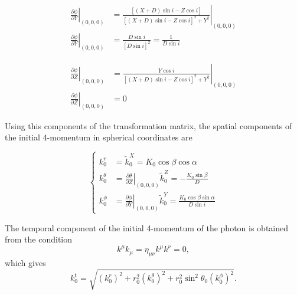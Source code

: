\begin{align}
\left. \frac{\partial \phi}{\partial Y} \right|_{(0,0,0)} &= \left.\frac{[(X+D)\sin i - Z \cos i ]}{[(X+D)\sin i - Z \cos i ]^2 + Y^2 } \right|_{(0,0,0)} \nonumber \\
\left. \frac{\partial \phi}{\partial Y} \right|_{(0,0,0)} &= \frac{D \sin i  }{[D \sin i ]^2 }  = \frac{1}{ D \sin i  }
\end{align}

\begin{align}
\left. \frac{\partial \phi}{\partial Z} \right|_{(0,0,0)} &= \left.\frac{Y \cos i}{[(X+D)\sin i - Z \cos i ]^2 + Y^2 } \right|_{(0,0,0)} \nonumber \\
\left. \frac{\partial \phi}{\partial Z} \right|_{(0,0,0)} &= 0  
\end{align}

Using this components of the transformation matrix, the spatial components of the initial 4-momentum in spherical coordinates are

\begin{equation}
\begin{cases}
k^r_0 &= \tilde{k}^X_0 = K_0 \cos \beta \cos \alpha  \\
k^\theta _0 &= \left. \frac{\partial \theta}{\partial Z} \right|_{(0,0,0)}  \tilde{k}^Z_0 = - \frac{K_0 \sin \beta}{D} \\
k^\phi _0 &= \left. \frac{\partial \phi}{\partial Y} \right|_{(0,0,0)}  \tilde{k}^Y_0 = \frac{K_0 \cos \beta \sin \alpha}{ D \sin i  }
\end{cases} \label{initialSpatialMomentum2}
\end{equation}

The temporal component of the initial 4-momentum of the photon is obtained from the condition 
\begin{equation}
k^\mu k_\mu =  \eta_{\mu \nu} k^\mu k^\nu = 0,
\end{equation}
which gives
\begin{equation}
k^t_0 = \sqrt{(k^r_0)^2 + r_0^2 (k^\theta _0)^2 + r_0^2 \sin^2 \theta_0 (k^\phi _0)^2}. \label{initialTempMomentum2}
\end{equation}

